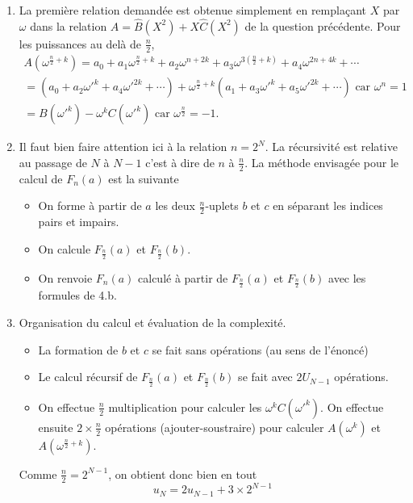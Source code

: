 \begin{enumerate}
\begin{enumerate}
 \item La première relation demandée est obtenue simplement en remplaçant $X$ par $\omega$ dans la relation $A = \widehat{B}(X^2) + X\widehat{C}(X^2)$ de la question précédente. Pour les puissances au delà de $\frac{n}{2}$,
\begin{multline*}
 A(\omega^{\frac{n}{2}+k})=
a_0+a_1\omega^{\frac{n}{2}+k}+a_2\omega^{n+2k}+a_3\omega^{3(\frac{n}{2}+k)}+a_4\omega^{2n+4k}+\cdots \\
= \left( a_0 + a_2\omega'^k +a_4\omega'^{2k} +\cdots \right) 
+ \omega^{\frac{n}{2}+k}\left( a_1 + a_3\omega'^k +a_5\omega'^{2k} +\cdots \right) \text{ car } \omega^n =1\\
= B(\omega'^k)-\omega^kC(\omega'^k)\text{ car } \omega^{\frac{n}{2}}=-1 . 
\end{multline*}

 \item Il faut bien faire attention ici à la relation $n=2^N$. La récursivité est relative au passage de $N$ à $N-1$ c'est à dire de $n$ à $\frac{n}{2}$.
La méthode envisagée pour le calcul de $F_n(a)$ est la suivante
\begin{itemize}
 \item On forme à partir de $a$ les deux $\frac{n}{2}$-uplets $b$ et $c$ en séparant les indices pairs et impairs.
 \item On calcule $F_{\frac{n}{2}}(a)$ et $F_{\frac{n}{2}}(b)$.
 \item On renvoie $F_n(a)$ calculé à partir de $F_{\frac{n}{2}}(a)$ et $F_{\frac{n}{2}}(b)$ avec les formules de 4.b.
\end{itemize}

 \item Organisation du calcul et évaluation de la complexité.
\begin{itemize}
 \item La formation de $b$ et $c$ se fait sans opérations (au sens de l'énoncé)
 \item Le calcul récursif de $F_{\frac{n}{2}}(a)$ et $F_{\frac{n}{2}}(b)$ se fait avec $2U_{N-1}$ opérations.
 \item On effectue $\frac{n}{2}$ multiplication pour calculer les $\omega^k C(\omega'^k)$. On effectue ensuite $2\times \frac{n}{2}$ opérations (ajouter-soustraire) pour calculer $A(\omega^{k})$ et $A(\omega^{\frac{n}{2}+k})$. 
\end{itemize}
Comme $\frac{n}{2}=2^{N-1}$, on obtient donc bien en tout
\begin{displaymath}
 u_N = 2u_{N-1} + 3\times 2^{N-1}
\end{displaymath}


\end{enumerate}
\end{enumerate}
